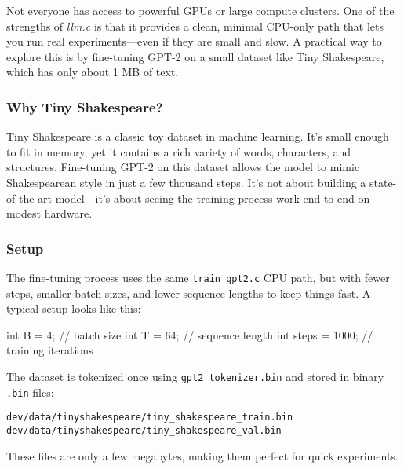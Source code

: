 \documentclass[
  letterpaper,
  DIV=11,
  numbers=noendperiod]{scrreprt}
\newenvironment{Shaded}{\begin{snugshade}}{\end{snugshade}}
\newcommand{\CommentTok}[1]{\textcolor[rgb]{0.37,0.37,0.37}{#1}}
\newcommand{\DataTypeTok}[1]{\textcolor[rgb]{0.68,0.00,0.00}{#1}}
\newcommand{\DecValTok}[1]{\textcolor[rgb]{0.68,0.00,0.00}{#1}}
\newcommand{\NormalTok}[1]{\textcolor[rgb]{0.00,0.23,0.31}{#1}}
\newcommand{\OperatorTok}[1]{\textcolor[rgb]{0.37,0.37,0.37}{#1}}
\begin{document}
Not everyone has access to powerful GPUs or large compute clusters. One
of the strengths of \emph{llm.c} is that it provides a clean, minimal
CPU-only path that lets you run real experiments---even if they are
small and slow. A practical way to explore this is by fine-tuning GPT-2
on a small dataset like Tiny Shakespeare, which has only about 1 MB of
text.

\subsubsection{Why Tiny Shakespeare?}\label{why-tiny-shakespeare}

Tiny Shakespeare is a classic toy dataset in machine learning. It's
small enough to fit in memory, yet it contains a rich variety of words,
characters, and structures. Fine-tuning GPT-2 on this dataset allows the
model to mimic Shakespearean style in just a few thousand steps. It's
not about building a state-of-the-art model---it's about seeing the
training process work end-to-end on modest hardware.

\subsubsection{Setup}\label{setup}

The fine-tuning process uses the same \texttt{train\_gpt2.c} CPU path,
but with fewer steps, smaller batch sizes, and lower sequence lengths to
keep things fast. A typical setup looks like this:

\begin{Shaded}
\begin{Highlighting}[]
\DataTypeTok{int}\NormalTok{ B }\OperatorTok{=} \DecValTok{4}\OperatorTok{;}    \CommentTok{// batch size}
\DataTypeTok{int}\NormalTok{ T }\OperatorTok{=} \DecValTok{64}\OperatorTok{;}   \CommentTok{// sequence length}
\DataTypeTok{int}\NormalTok{ steps }\OperatorTok{=} \DecValTok{1000}\OperatorTok{;}  \CommentTok{// training iterations}
\end{Highlighting}
\end{Shaded}

The dataset is tokenized once using \texttt{gpt2\_tokenizer.bin} and
stored in binary \texttt{.bin} files:

\begin{verbatim}
dev/data/tinyshakespeare/tiny_shakespeare_train.bin
dev/data/tinyshakespeare/tiny_shakespeare_val.bin
\end{verbatim}

These files are only a few megabytes, making them perfect for quick
experiments.
\end{document}
